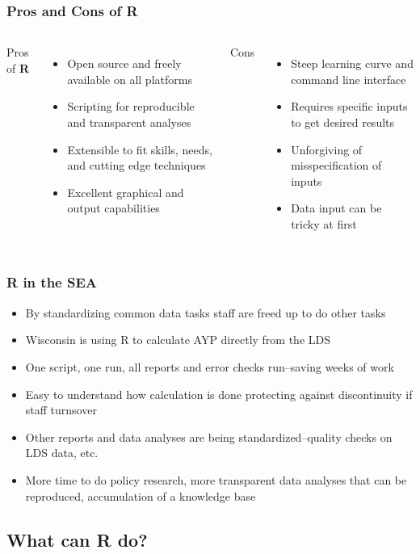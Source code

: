 \documentclass{beamer}
\begin{document}
\begin{frame}
\frametitle{Pros and Cons of R}
  \begin{columns}
  Pros of \textbf{R}
  \begin{itemize}
  \item Open source and freely available on all platforms
  \item Scripting for reproducible and transparent analyses
  \item Extensible to fit skills, needs, and cutting edge techniques
  \item Excellent graphical and output capabilities
  \end{itemize}
  Cons
  \begin{itemize}
  \item Steep learning curve and command line interface
  \item Requires specific inputs to get desired results
  \item Unforgiving of misspecification of inputs
  \item Data input can be tricky at first
  \end{itemize}
  \end{columns}
\end{frame}

\begin{frame}
\frametitle{R in the SEA}
\begin{itemize}
  \item By standardizing common data tasks staff are freed up to do other tasks
  \pause
  \item Wisconsin is using R to calculate AYP directly from the LDS
  \pause
  \item One script, one run, all reports and error checks run--saving weeks of work
  \pause
  \item Easy to understand how calculation is done protecting against discontinuity if staff turnsover
  \pause
  \item Other reports and data analyses are being standardized--quality checks on LDS data, etc.
  \pause
  \item More time to do policy research, more transparent data analyses that can be reproduced, accumulation of a knowledge base 
\end{itemize}
\end{frame}
  


\subsection{What can R do?}
\end{document}
